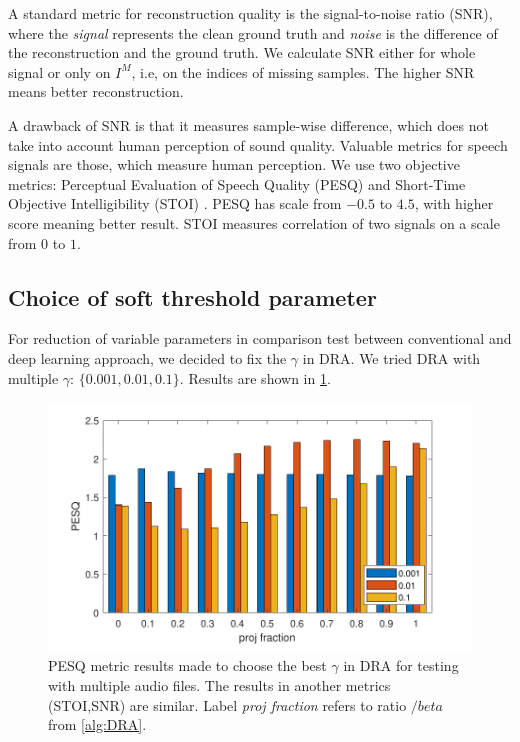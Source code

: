 \documentclass[conference]{IEEEtran}
\newcommand{\todo}[1]{\textcolor{red}{#1}}
\begin{document}

A standard metric for reconstruction quality is the signal-to-noise ratio (SNR), where the \textit{signal} represents the clean ground truth and \textit{noise} is the difference of the reconstruction and the ground truth.
We calculate SNR either for whole signal or only on $I^M$, i.e, on the indices of missing samples.
The higher SNR means better reconstruction.

A drawback of SNR is that it measures sample-wise difference, which does not take into account human perception of sound quality.
Valuable metrics for speech signals are those, which measure human perception.
We use two objective metrics: Perceptual Evaluation of Speech Quality (PESQ) \cite{Rix2001} and 
Short-Time Objective Intelligibility (STOI) \cite{Taal2010}.
PESQ has scale from $-0.5$ to $4.5$, with higher score meaning better result.
STOI measures correlation of two signals on a scale from $0$ to $1$.

\subsection{Choice of soft threshold parameter}\label{subsec:soft_thresh}

For reduction of variable parameters in comparison test between conventional and deep learning approach, we decided to fix the $\gamma$ in DRA.
We tried DRA with multiple $\gamma$: $\{0.001, 0.01,0.1\}$.
Results are shown in \ref{fig:gammatest}.

\begin{figure}[h]
	\includegraphics[width=1\linewidth]{figures/gamma_test}
	\caption{PESQ metric results made to choose the best $\gamma$ in DRA for testing with multiple audio files.
	The results in another metrics (STOI,SNR) are similar.
	Label \textit{proj fraction} refers to ratio $/beta$ from \ref{alg:DRA}.}
	\label{fig:gammatest}
\end{figure}
\end{document}
